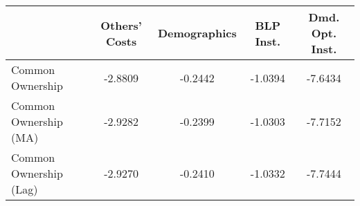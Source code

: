 \begin{tabular}{lcccc}
\toprule
                        &  Others' Costs &  Demographics &  BLP Inst. &  Dmd. Opt. Inst. \\
\midrule
       Common Ownership &        -2.8809 &       -0.2442 &    -1.0394 &          -7.6434 \\
  Common Ownership (MA) &        -2.9282 &       -0.2399 &    -1.0303 &          -7.7152 \\
 Common Ownership (Lag) &        -2.9270 &       -0.2410 &    -1.0332 &          -7.7444 \\
\bottomrule
\end{tabular}
